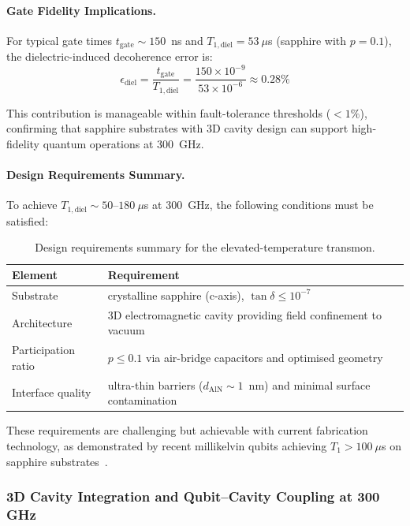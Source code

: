 \paragraph{Gate Fidelity Implications.}
For typical gate times $t_{\text{gate}} \sim 150$~ns and $T_{1,\text{diel}} = 53~\mu$s (sapphire with $p=0.1$), the dielectric-induced decoherence error is:
\begin{equation}
\epsilon_{\text{diel}} = \frac{t_{\text{gate}}}{T_{1,\text{diel}}} = \frac{150 \times 10^{-9}}{53 \times 10^{-6}} \approx 0.28\%
\end{equation}

This contribution is manageable within fault-tolerance thresholds ($< 1\%$), confirming that sapphire substrates with 3D cavity design can support high-fidelity quantum operations at 300~GHz.

\paragraph{Design Requirements Summary.}
To achieve $T_{1,\text{diel}} \sim 50$--$180~\mu$s at 300~GHz, the following conditions must be satisfied:
\begin{table}[h]
\centering
\begin{tabular}{@{}lp{}@{}}
\toprule
\textbf{Element} & \textbf{Requirement} \\
\midrule
Substrate            & crystalline sapphire (c-axis), $\tan\delta \le 10^{-7}$ \\
Architecture         & 3D electromagnetic cavity providing field confinement to vacuum \\
Participation ratio  & $p \le 0.1$ via air-bridge capacitors and optimised geometry \\
Interface quality    & ultra-thin barriers ($d_{\text{AlN}} \sim 1$~nm) and minimal surface contamination \\
\bottomrule
\end{tabular}
\caption{Design requirements summary for the elevated-temperature transmon.}
\label{tab:design_requirements_summary}
\end{table}

These requirements are challenging but achievable with current fabrication technology, as demonstrated by recent millikelvin qubits achieving $T_1 > 100~\mu$s on sapphire substrates~\cite{place2021}.

\subsubsection{3D Cavity Integration and Qubit--Cavity Coupling at 300\,GHz}
\label{sec:cavity_integration_300ghz}

